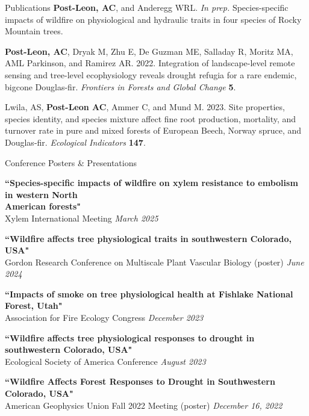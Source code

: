 \documentclass{resume} %
\begin{document}
\begin{rSection}{Publications}
{\bf Post-Leon, AC}, and Anderegg WRL. {\em In prep.} Species-specific impacts of wildfire on physiological and hydraulic traits in four species of Rocky Mountain trees. \smallskip 

{\bf Post-Leon, AC}, Dryak M, Zhu E, De Guzman ME, Salladay R, Moritz MA, AML Parkinson, and Ramirez AR. 2022. Integration of landscape-level remote sensing and tree-level ecophysiology reveals drought refugia for a rare endemic, bigcone Douglas-fir. {\it Frontiers in Forests and Global Change }{\bf 5}.\smallskip

Lwila, AS, {\bf Post-Leon AC}, Ammer C, and Mund M. 2023. Site properties, species identity, and species mixture affect fine root production, mortality, and turnover rate in pure and mixed forests of European Beech, Norway spruce, and Douglas-fir. {\it Ecological Indicators }{\bf 147}.
\smallskip
\end{rSection}


\begin{rSection}{Conference Posters \& Presentations}

{\bf ``Species-specific impacts of wildfire on xylem resistance to embolism in western North\\ \hspace*{0.25em} American forests" }\\ 
\hspace*{0.25em}
Xylem International Meeting \hfill {\em March 2025} 

{\bf ``Wildfire affects tree physiological traits in southwestern Colorado, USA" }\\ 
\hspace*{0.25em}
Gordon Research Conference on Multiscale Plant Vascular Biology (poster)  \hfill {\em June 2024} 

{\bf ``Impacts of smoke on tree physiological health at Fishlake National Forest, Utah" }\\ 
\hspace*{0.25em}
Association for Fire Ecology Congress \hfill {\em December 2023} 

{\bf ``Wildfire affects tree physiological responses to drought in southwestern Colorado, USA" }\\ 
\hspace*{0.25em}
Ecological Society of America Conference \hfill {\em August 2023} 

{\bf ``Wildfire Affects Forest Responses to Drought in Southwestern Colorado, USA" }\\ \hspace*{0.25em}
American Geophysics Union Fall 2022 Meeting (poster) \hfill {\em December 16, 2022}
\smallskip

\end{rSection}
\end{document}
